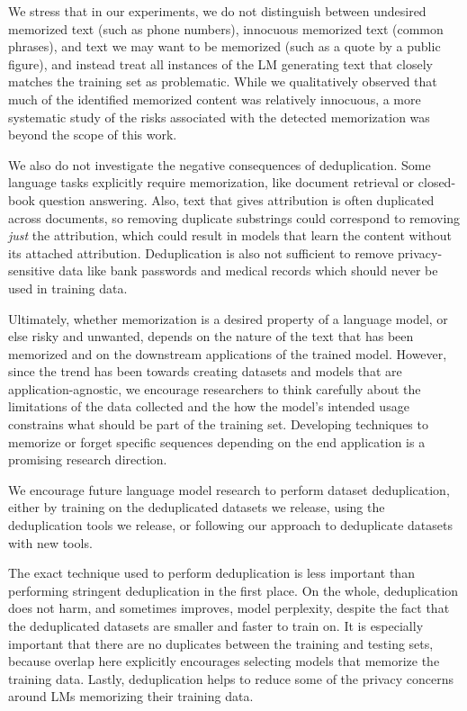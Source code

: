 We stress that in our experiments, we do not distinguish between undesired memorized text (such as phone numbers), innocuous memorized text (common phrases), and text we may want to be memorized (such as a quote by a public figure), and instead treat all instances of the LM generating text that closely matches the training set as problematic.
While we qualitatively observed that much of the identified memorized content was relatively innocuous, a more systematic study of the risks associated with the detected memorization was beyond the scope of this work.

We also do not investigate the negative consequences of deduplication.
Some language tasks explicitly require memorization, like document retrieval or closed-book question answering. 
Also, text that gives attribution is often duplicated across documents, so
removing duplicate substrings could correspond to removing \emph{just} the attribution, which could result in models that learn the content without its attached attribution.
Deduplication is also not sufficient to remove privacy-sensitive data like bank passwords and medical records which should never be used in training data.

Ultimately, whether memorization is a desired property of a language model, or else risky and unwanted, depends
on the nature of the text that has been memorized and on the downstream applications of the trained model.
However, since the trend has been towards creating datasets and models that are application-agnostic, we encourage researchers to think carefully about the limitations of the data
collected and the how the model's intended usage constrains what should be part of the training set. 
Developing techniques to memorize or forget specific sequences depending on the end application is a promising research direction. 

We encourage future language model research to perform dataset deduplication, either by training on the deduplicated datasets we release, using the deduplication tools we release, or following our approach to deduplicate datasets with new tools.

The exact technique used to perform deduplication is less important than performing stringent deduplication in the first place.
On the whole, deduplication does not harm, and sometimes improves, model perplexity, despite the fact that the deduplicated datasets are smaller and faster to train on.
It is especially important that there are no duplicates between the training and testing sets, because overlap here explicitly encourages selecting models that memorize the training data.
Lastly, deduplication helps to reduce some of the privacy concerns around LMs memorizing their training data.


